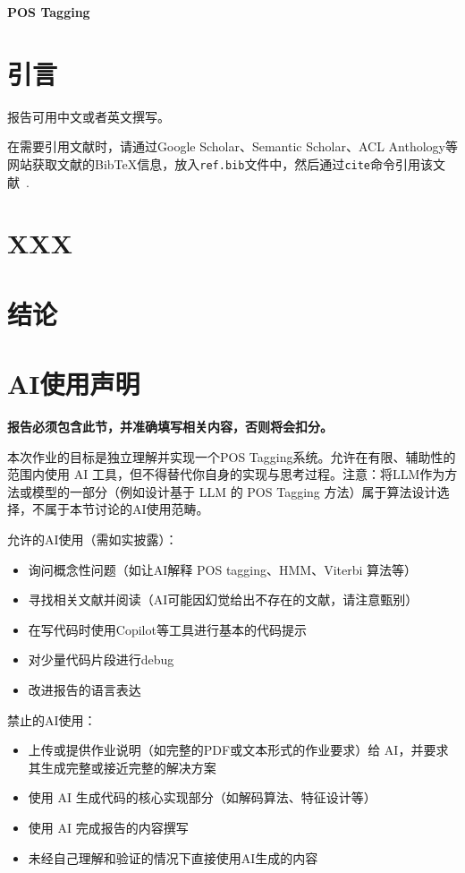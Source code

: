 \documentclass[12pt,letterpaper]{article}
\begin{document}
\begin{center}
    \LARGE
    \bf
    POS Tagging
\end{center}

\section{引言}
报告可用中文或者英文撰写。

在需要引用文献时，请通过Google Scholar、Semantic Scholar、ACL Anthology等网站获取文献的BibTeX信息，放入\texttt{ref.bib}文件中，然后通过\texttt{cite}命令引用该文献~\cite{vaswani2017attention}.

\section{XXX}


\section{结论}


\section{AI使用声明}
\textbf{报告必须包含此节，并准确填写相关内容，否则将会扣分。}

本次作业的目标是独立理解并实现一个POS Tagging系统。允许在有限、辅助性的范围内使用 AI 工具，但不得替代你自身的实现与思考过程。注意：将LLM作为方法或模型的一部分（例如设计基于 LLM 的 POS Tagging 方法）属于算法设计选择，不属于本节讨论的AI使用范畴。

允许的AI使用（需如实披露）：
\begin{itemize}
    \item 询问概念性问题（如让AI解释 POS tagging、HMM、Viterbi 算法等）
    \item 寻找相关文献并阅读（AI可能因幻觉给出不存在的文献，请注意甄别）
    \item 在写代码时使用Copilot等工具进行基本的代码提示
    \item 对少量代码片段进行debug
    \item 改进报告的语言表达
\end{itemize}


禁止的AI使用：
\begin{itemize}
    \item 上传或提供作业说明（如完整的PDF或文本形式的作业要求）给 AI，并要求其生成完整或接近完整的解决方案
    \item 使用 AI 生成代码的核心实现部分（如解码算法、特征设计等）
    \item 使用 AI 完成报告的内容撰写
    \item 未经自己理解和验证的情况下直接使用AI生成的内容
\end{itemize}
\end{document}
